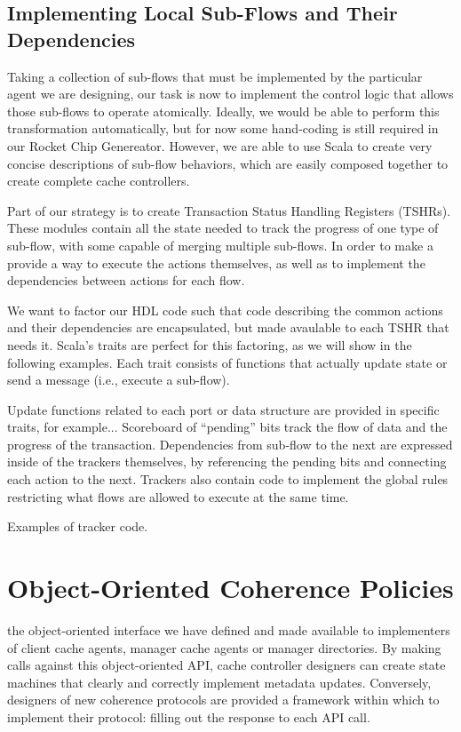 \subsection{Implementing Local Sub-Flows and Their Dependencies}

Taking a collection of sub-flows that must be implemented by the particular agent we are designing,
our task is now to implement the control logic that allows those sub-flows to operate atomically.
Ideally, we would be able to perform this transformation automatically, 
but for now some hand-coding is still required in our Rocket Chip Genereator.
However, we are able to use Scala to create very concise descriptions of sub-flow behaviors,
which are easily composed together to create complete cache controllers.

Part of our strategy is to create Transaction Status Handling Registers (TSHRs).
These modules contain all the state needed to track the progress of 
one type of sub-flow, with some capable of merging multiple sub-flows.
In order to make a
provide a way to execute the actions themselves, as well as to implement the dependencies between actions for each flow.

We want to factor our HDL code such that code describing the common actions and their dependencies are encapsulated,
but made avaulable to each TSHR that needs it.
Scala's traits are perfect for this factoring, as we will show in the following examples.
Each trait consists of functions that actually update state or send a message (i.e., execute a sub-flow).

Update functions related to each port or data structure are provided in specific traits, for example...
Scoreboard of ``pending'' bits track the flow of data and the progress of the transaction.
Dependencies from sub-flow to the next are expressed inside of the trackers themselves,
by referencing the pending bits and connecting each action to the next.
Trackers also contain code to implement the global rules restricting what flows are allowed to execute at the same time.

Examples of tracker code.


\section{Object-Oriented Coherence Policies}

the object-oriented interface
we have defined and made available to implementers of client cache agents, manager cache agents or manager directories. 
By making calls against this object-oriented API, cache controller designers can
create state machines that clearly and correctly implement metadata updates. 
Conversely, designers of new coherence protocols are provided a framework
within which to implement their protocol: filling out the response to each API call.

